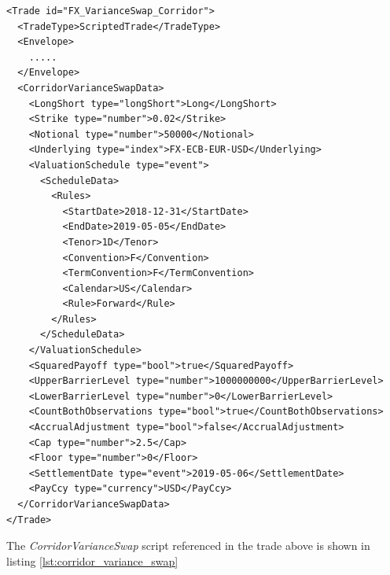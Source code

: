\begin{verbatim}
<Trade id="FX_VarianceSwap_Corridor">
  <TradeType>ScriptedTrade</TradeType>
  <Envelope>
    .....
  </Envelope>
  <CorridorVarianceSwapData>
    <LongShort type="longShort">Long</LongShort>
    <Strike type="number">0.02</Strike>
    <Notional type="number">50000</Notional>
    <Underlying type="index">FX-ECB-EUR-USD</Underlying>
    <ValuationSchedule type="event">
      <ScheduleData>
        <Rules>
          <StartDate>2018-12-31</StartDate>
          <EndDate>2019-05-05</EndDate>
          <Tenor>1D</Tenor>
          <Convention>F</Convention>
          <TermConvention>F</TermConvention>
          <Calendar>US</Calendar>
          <Rule>Forward</Rule>
        </Rules>
      </ScheduleData>
    </ValuationSchedule>
    <SquaredPayoff type="bool">true</SquaredPayoff>
    <UpperBarrierLevel type="number">1000000000</UpperBarrierLevel>
    <LowerBarrierLevel type="number">0</LowerBarrierLevel>
    <CountBothObservations type="bool">true</CountBothObservations>
    <AccrualAdjustment type="bool">false</AccrualAdjustment>
    <Cap type="number">2.5</Cap>
    <Floor type="number">0</Floor>
    <SettlementDate type="event">2019-05-06</SettlementDate>
    <PayCcy type="currency">USD</PayCcy>
  </CorridorVarianceSwapData>
</Trade>
\end{verbatim}

The \emph{CorridorVarianceSwap} script referenced in the trade above is shown in listing
\ref{lst:corridor_variance_swap}

